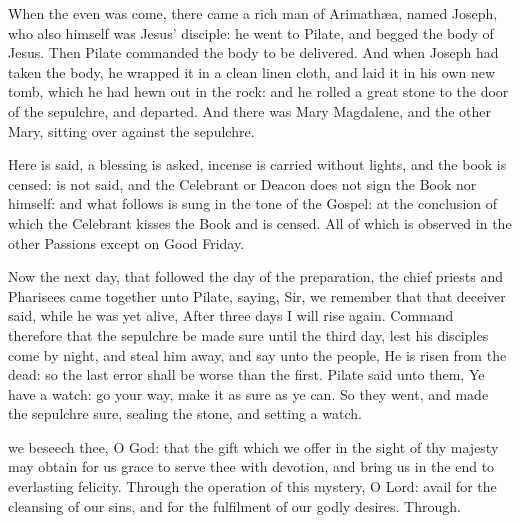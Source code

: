 When the even was come, there came a rich man of Arimath{\ae}a, named Joseph, who also himself was Jesus' disciple: he went to Pilate, and begged the body of Jesus. Then Pilate commanded the body to be delivered. And when Joseph had taken the body, he wrapped it in a clean linen cloth, and laid it in his own new tomb, which he had hewn out in the rock: and he rolled a great stone to the door of the sepulchre, and departed. And there was Mary Magdalene, and the other Mary, sitting over against the sepulchre.
\begin{rubric}
    Here  is said, a blessing is asked, incense is carried without lights, and the book is censed:  is not said, and the Celebrant or Deacon does not sign the Book nor himself: and what follows is sung in the tone of the Gospel: at the conclusion of which the Celebrant kisses the Book and is censed. All of which is observed in the other Passions except on Good Friday.
\end{rubric}
Now the next day, that followed the day of the preparation, the chief priests and Pharisees came together unto Pilate, saying, Sir, we remember that that deceiver said, while he was yet alive, After three days I will rise again. Command therefore that the sepulchre be made sure until the third day, lest his disciples come by night, and steal him away, and say unto the people, He is risen from the dead: so the last error shall be worse than the first. Pilate said unto them, Ye have a watch: go your way, make it as sure as ye can. So they went, and made the sepulchre sure, sealing the stone, and setting a watch.

\secret
{} we beseech thee, O God: that the gift which we offer in the sight of thy majesty may obtain for us grace to serve thee with devotion, and bring us in the end to everlasting felicity. Through
\postcommunion
{} the operation of this mystery, O Lord: avail for the cleansing of our sins, and for the fulfilment of our godly desires. Through.


\clearpage
{}

